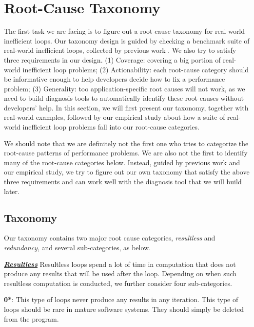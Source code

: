 \section{Root-Cause Taxonomy}
\label{sec:study}

The first task we are facing is to figure out a root-cause taxonomy for
real-world inefficient loops. 
Our taxonomy design is guided by checking a benchmark suite of real-world
inefficient loops, collected by previous work \citep{SongOOPSLA2014,PerfBug}. 
We also try to satisfy three requirements in our design.
(1) Coverage: covering
a big portion of real-world inefficient loop problems; 
(2) Actionability: each root-cause category should be informative enough 
to help developers
decide how to fix a performance problem; 
(3) Generality: too application-specific root causes will not work, as we
need to build diagnosis tools to automatically identify these root causes 
without developers' help.
In this section, we will first present our taxonomy, together with real-world
examples, followed by our empirical study about how a suite of real-world 
inefficient
loop problems fall into our root-cause categories.

We should note that we are definitely not the first one who tries to categorize
the root-cause patterns of performance problems. We are also not the first
to identify many of the root-cause categories below. Instead, guided by
previous work and our empirical study, we try to figure out our own taxonomy 
that satisfy the above three requirements and can
work well with the diagnosis tool that we will build later.

\subsection{Taxonomy}
\label{sec:study_tax}
Our taxonomy contains two major root cause categories,
\textit{resultless} and \textit{redundancy}, and several sub-categories, 
as below.

\underline{\textit{\textbf{Resultless}}}
Resultless loops spend a lot of time in computation that does not 
produce any results that will be used after the loop.
Depending on when such resultless computation is conducted, we further
consider four sub-categories.

{\textbf{0*}}: 
This type of loops never produce any results in any iteration.
This type of loops should be rare in mature software systems.
They should simply be deleted from the program.

